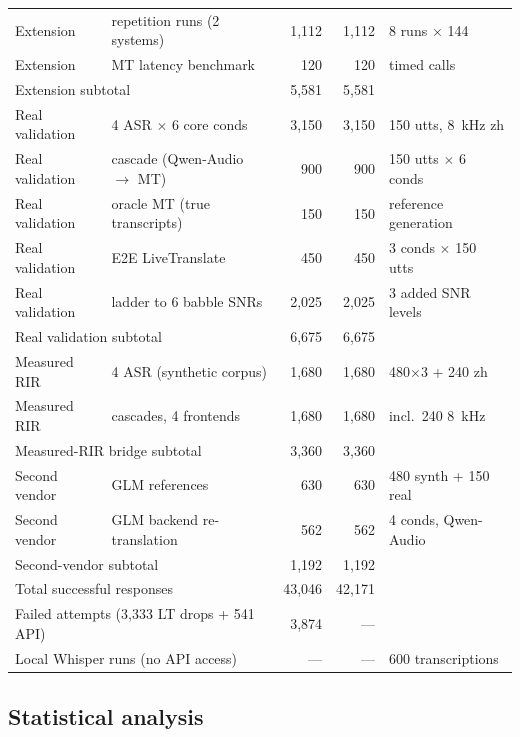 \begin{table}[t]
\begin{tabular}{llrrl}
Extension & repetition runs (2 systems) & 1{,}112 & 1{,}112 & 8 runs $\times$ 144 \\
Extension & MT latency benchmark & 120 & 120 & timed calls \\
\midrule
\multicolumn{2}{l}{Extension subtotal} & 5{,}581 & 5{,}581 & \\
\midrule
Real validation & 4 ASR $\times$ 6 core conds & 3{,}150 & 3{,}150 & 150 utts, 8~kHz zh \\
Real validation & cascade (Qwen-Audio $\to$ MT) & 900 & 900 & 150 utts $\times$ 6 conds \\
Real validation & oracle MT (true transcripts) & 150 & 150 & reference generation \\
Real validation & E2E LiveTranslate & 450 & 450 & 3 conds $\times$ 150 utts \\
Real validation & ladder to 6 babble SNRs & 2{,}025 & 2{,}025 & 3 added SNR levels \\
\midrule
\multicolumn{2}{l}{Real validation subtotal} & 6{,}675 & 6{,}675 & \\
\midrule
Measured RIR & 4 ASR (synthetic corpus) & 1{,}680 & 1{,}680 & 480$\times$3 + 240 zh \\
Measured RIR & cascades, 4 frontends & 1{,}680 & 1{,}680 & incl.\ 240 8~kHz \\
\midrule
\multicolumn{2}{l}{Measured-RIR bridge subtotal} & 3{,}360 & 3{,}360 & \\
\midrule
Second vendor & GLM references & 630 & 630 & 480 synth + 150 real \\
Second vendor & GLM backend re-translation & 562 & 562 & 4 conds, Qwen-Audio \\
\midrule
\multicolumn{2}{l}{Second-vendor subtotal} & 1{,}192 & 1{,}192 & \\
\midrule
\multicolumn{2}{l}{Total successful responses} & 43{,}046 & 42{,}171 & \\
\multicolumn{2}{l}{Failed attempts (3{,}333 LT drops + 541 API)} & 3{,}874 & --- & \\
\multicolumn{2}{l}{Local Whisper runs (no API access)} & --- & --- & 600 transcriptions \\
\bottomrule
\end{tabular}
\end{table}

\subsection{Statistical analysis}

